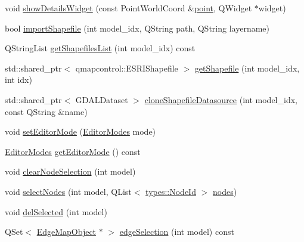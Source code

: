 \begin{DoxyCompactItemize}
\item 
void \mbox{\hyperlink{class_map_objects_controller_a605d5cd07061562cc5b61ed1ab258c64}{show\+Details\+Widget}} (const Point\+World\+Coord \&\mbox{\hyperlink{diffusion_8cpp_a380468221cb8294f9329d11c99c4da30}{point}}, Q\+Widget $\ast$widget)
\item 
bool \mbox{\hyperlink{class_map_objects_controller_a98ea309344d8fa1f9529acbc8362b0a2}{import\+Shapefile}} (int model\+\_\+idx, Q\+String path, Q\+String layername)
\item 
Q\+String\+List \mbox{\hyperlink{class_map_objects_controller_a6c76b80e0704cc2f2727e9dd0d789e51}{get\+Shapefiles\+List}} (int model\+\_\+idx) const
\item 
std\+::shared\+\_\+ptr$<$ qmapcontrol\+::\+E\+S\+R\+I\+Shapefile $>$ \mbox{\hyperlink{class_map_objects_controller_a8c0addc52e6f82f5541e51ac6a13a3a1}{get\+Shapefile}} (int model\+\_\+idx, int idx)
\item 
std\+::shared\+\_\+ptr$<$ G\+D\+A\+L\+Dataset $>$ \mbox{\hyperlink{class_map_objects_controller_a99b3d4cfbe9826a61aa9bc4cd6695c13}{clone\+Shapefile\+Datasource}} (int model\+\_\+idx, const Q\+String \&name)
\item 
void \mbox{\hyperlink{class_map_objects_controller_a16f39bb55ff193cbe7881aac12652672}{set\+Editor\+Mode}} (\mbox{\hyperlink{class_map_objects_controller_a57082b858408bbc9d2b4f0f71853e687}{Editor\+Modes}} mode)
\item 
\mbox{\hyperlink{class_map_objects_controller_a57082b858408bbc9d2b4f0f71853e687}{Editor\+Modes}} \mbox{\hyperlink{class_map_objects_controller_a7842b8f3a535dcdc89bd586568cba116}{get\+Editor\+Mode}} () const
\item 
void \mbox{\hyperlink{class_map_objects_controller_a55368b853ad3ae3849026b3bacdf6bb5}{clear\+Node\+Selection}} (int model)
\item 
void \mbox{\hyperlink{class_map_objects_controller_a1e080ffc4ca6c4fbaa76fe5d30db016d}{select\+Nodes}} (int model, Q\+List$<$ \mbox{\hyperlink{classtypes_1_1_node_id}{types\+::\+Node\+Id}} $>$ \mbox{\hyperlink{thread__vessels_8cpp_ace5675146c8515428d094fd142d8a2d2}{nodes}})
\item 
void \mbox{\hyperlink{class_map_objects_controller_a1cf5a89c6f307188562ea349f7ffb04f}{del\+Selected}} (int model)
\item 
Q\+Set$<$ \mbox{\hyperlink{class_edge_map_object}{Edge\+Map\+Object}} $\ast$ $>$ \mbox{\hyperlink{class_map_objects_controller_aa97f16d6d321517de8dfbaff19cac9a6}{edge\+Selection}} (int model) const
\item 

\end{DoxyCompactItemize}
